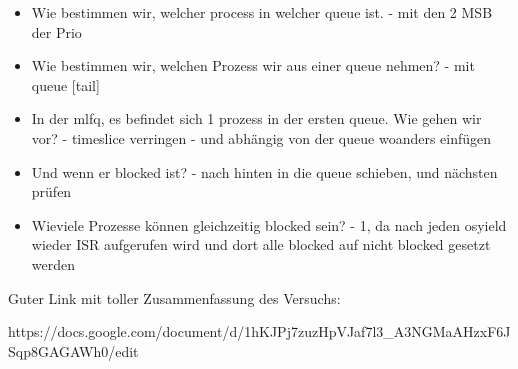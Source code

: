 \documentclass[12pt,a4paper]{article}
\begin{document}
\begin{itemize}
\item Wie bestimmen wir, welcher process in welcher queue ist.
- mit den 2 MSB der Prio

\item Wie bestimmen wir, welchen Prozess wir aus einer queue nehmen?
- mit queue [tail]

\item In der mlfq, es befindet sich 1 prozess in der ersten queue. Wie gehen wir vor?
- timeslice verringen
- und abhängig von der queue woanders einfügen

\item Und wenn er blocked ist?
- nach hinten in die queue schieben, und nächsten prüfen

\item Wieviele Prozesse können gleichzeitig blocked sein?
- 1, da nach jeden osyield wieder ISR aufgerufen wird und dort alle blocked auf nicht blocked gesetzt werden
\end{itemize}

Guter Link mit toller Zusammenfassung des Versuchs:

https://docs.google.com/document/d/1hKJPj7zuzHpVJaf7l3_A3NGMaAHzxF6JSqp8GAGAWh0/edit
\end{document}
